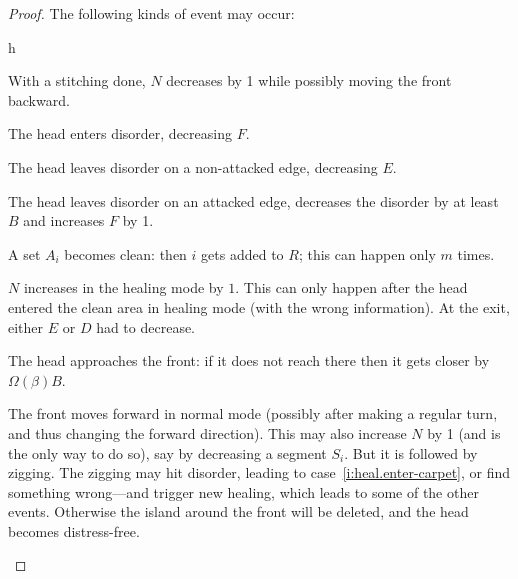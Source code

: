 \documentclass[11pt]{memoir}
\theoremstyle{definition} %
\def\B{B}
\begin{document}
\begin{proof}
The following kinds of event may occur:
\begin{varenum}{h}

\item\label{i:heal.N-decr} With a stitching done, \( N \) decreases by 1 while possibly 
moving the front backward.

\item\label{i:heal.enter-carpet} The head enters disorder, decreasing \( F \).

\item\label{i:heal.leave-carpet.E}
The head leaves disorder on a non-attacked edge, decreasing \( E \).

\item\label{i:heal.leave-carpet.F}
The head leaves disorder on an attacked edge, decreases the disorder by at least \( \B \) and
increases \( F \) by 1.


\item\label{i:heal.clean}
A set \( A_{i} \) becomes clean: then \( i \) gets added to \( R \); 
this can happen only \( m \) times.

\item\label{i:heal.N-incr.healing}
\( N \) increases in the healing mode by \( 1 \).
This can only happen after the head entered the clean area in healing mode (with the wrong information).
At the exit, either \( E \) or \( D \) had to decrease.

\item\label{i:heal.approach-front} 
The head approaches the front: if it does not reach there then it gets closer by  
 \( \Omega(\beta)\B \).

\item\label{i:heal.front-move} The front moves forward in normal mode
(possibly after making a regular turn, and thus changing the forward direction).
This may also increase \( N \) by 1 (and is the only way to do so), 
say by decreasing a segment \( S_{i} \).
But it is followed by zigging.
The zigging may hit disorder, leading to case~\eqref{i:heal.enter-carpet},
or find something wrong---and trigger new healing, which leads to some of the other events.
Otherwise the island around the front will be deleted, and the head becomes distress-free.
\end{varenum}


\end{proof}
\end{document}
